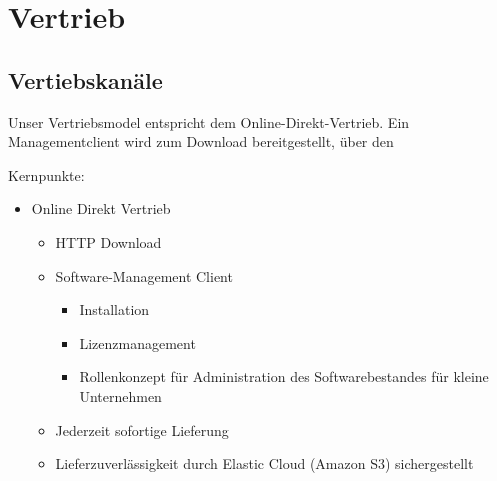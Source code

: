 \chapter{Vertrieb}
	\section{Vertiebskan\"ale}
	
Unser Vertriebsmodel entspricht dem Online-Direkt-Vertrieb. Ein Managementclient wird zum Download bereitgestellt, über den 
	
	Kernpunkte:\\
	\begin{itemize}
		\item Online Direkt Vertrieb
		\begin{itemize}
			\item HTTP Download
			\item Software-Management Client
				\begin{itemize}
					\item Installation
					\item Lizenzmanagement
					\item Rollenkonzept f\"ur Administration des Softwarebestandes f\"ur kleine Unternehmen
				\end{itemize}
			\item Jederzeit sofortige Lieferung
			\item Lieferzuverlässigkeit durch Elastic Cloud (Amazon S3) sichergestellt
		\end{itemize}
	\end{itemize}
